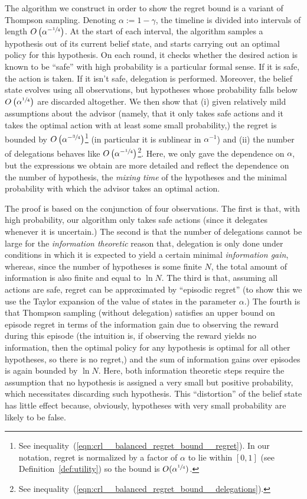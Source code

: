 \documentclass[anon,12pt]{colt2018} %
\newcommand{\AP}[1]{\left(#1\right)}
\begin{document}
The algorithm we construct in order to show the regret bound is a variant of Thompson sampling. Denoting $\alpha:=1-\gamma$, the timeline is divided into intervals of length $O\AP{\alpha^{-\sfrac{1}{4}}}$. At the start of each interval, the algorithm samples a hypothesis out of its current belief state, and starts carrying out an optimal policy for this hypothesis. On each round, it checks whether the desired action is known to be \enquote{safe} with high probability is a particular formal sense. If it is safe, the action is taken. If it isn't safe, delegation is performed. Moreover, the belief state evolves using all observations, but hypotheses whose probability falls below $O\AP{\alpha^{\sfrac{1}{4}}}$ are discarded altogether. We then show that (i) given relatively mild assumptions about the advisor (namely, that it only takes safe actions and it takes the optimal action with at least some small probability,) the regret is bounded by $O\AP{\alpha^{-\sfrac{3}{4}}}$\footnote{See inequality~(\ref{eqn:crl__balanced_regret_bound__regret}). In our notation, regret is normalized by a factor of $\alpha$ to lie within $[0,1]$ (see Definition~\ref{def:utility}) so the bound is $O(\alpha^{\sfrac{1}{4}})$.} (in particular it is sublinear in $\alpha^{-1}$) and (ii) the number of delegations behaves like $O\AP{\alpha^{-\sfrac{1}{4}}}$\footnote{See inequality~(\ref{eqn:crl__balanced_regret_bound__delegations}).}. Here, we only gave the dependence on $\alpha$, but the expressions we obtain are more detailed and reflect the dependence on the number of hypothesis, the \emph{mixing time} of the hypotheses and the minimal probability with which the advisor takes an optimal action.

The proof is based on the conjunction of four observations. The first is that, with high probability, our algorithm only takes safe actions (since it delegates whenever it is uncertain.) The second is that the number of delegations cannot be large for the \emph{information theoretic} reason that, delegation is only done under conditions in which it is expected to yield a certain minimal \emph{information gain}, whereas, since the number of hypotheses is some finite $N$, the total amount of information is also finite and equal to $\ln N$. The third is that, assuming all actions are safe, regret can be approximated by \enquote{episodic regret} (to show this we use the Taylor expansion of the value of states in the parameter $\alpha$.) The fourth is that Thompson sampling (without delegation) satisfies an upper bound on episode regret in terms of the information gain due to observing the reward during this episode (the intuition is, if observing the reward yields no information, then the optimal policy for any hypothesis is optimal for all other hypotheses, so there is no regret,) and the sum of information gains over episodes is again bounded by $\ln N$. Here, both information theoretic steps require the assumption that no hypothesis is assigned a very small but positive probability, which necessitates discarding such hypothesis. This \enquote{distortion} of the belief state has little effect because, obviously, hypotheses with very small probability are likely to be false.
\end{document}
